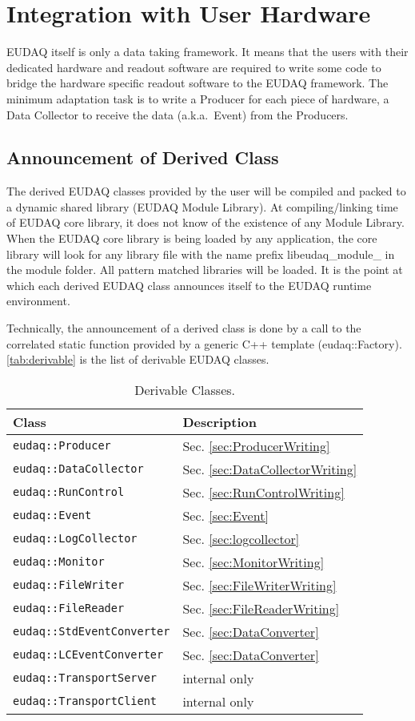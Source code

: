 \section{Integration with User Hardware}\label{sec:Integration}
EUDAQ itself is only a data taking framework. It means that the users with their dedicated hardware and readout software are required to write some code to bridge the hardware specific readout software to the EUDAQ framework. The minimum adaptation task is to write a Producer for each piece of hardware, a Data Collector to receive the data (a.k.a.\ Event) from the Producers. 

\subsection{Announcement of Derived Class}
The derived EUDAQ classes provided by the user will be compiled and packed to a dynamic shared library (EUDAQ Module Library). At compiling/linking time of EUDAQ core library, it does not know of the existence of any Module Library. When the EUDAQ core library is being loaded by any application, the core library will look for any library file with the name prefix libeudaq\_module\_ in the module folder. All pattern matched libraries will be loaded. It is the point at which each derived EUDAQ class announces itself to the EUDAQ runtime environment.

Technically, the announcement of a derived class is done by a call to the correlated static function provided by a generic C++ template (eudaq::Factory). \autoref{tab:derivable} is the list of derivable EUDAQ classes.

\begin{table}
\centering
\small
\begin{tabular}{ l | l }
  \textbf{Class} & \textbf{Description}\\
  \hline
  \texttt{eudaq::Producer} & Sec. \ref{sec:ProducerWriting}\\
  \texttt{eudaq::DataCollector} & Sec. \ref{sec:DataCollectorWriting}\\
  \texttt{eudaq::RunControl} & Sec. \ref{sec:RunControlWriting}\\
  \texttt{eudaq::Event} &  Sec. \ref{sec:Event} \\
  \texttt{eudaq::LogCollector} & Sec. \ref{sec:logcollector} \\
  \texttt{eudaq::Monitor} & Sec. \ref{sec:MonitorWriting}\\
  \texttt{eudaq::FileWriter} & Sec. \ref{sec:FileWriterWriting}\\
  \texttt{eudaq::FileReader} & Sec. \ref{sec:FileReaderWriting}\\
  \texttt{eudaq::StdEventConverter} & Sec. \ref{sec:DataConverter} \\
  \texttt{eudaq::LCEventConverter} & Sec. \ref{sec:DataConverter} \\
  \texttt{eudaq::TransportServer} & internal only \\
  \texttt{eudaq::TransportClient} & internal only \\
\end{tabular}
\caption{Derivable Classes.}
\label{tab:derivable}
\end{table}

